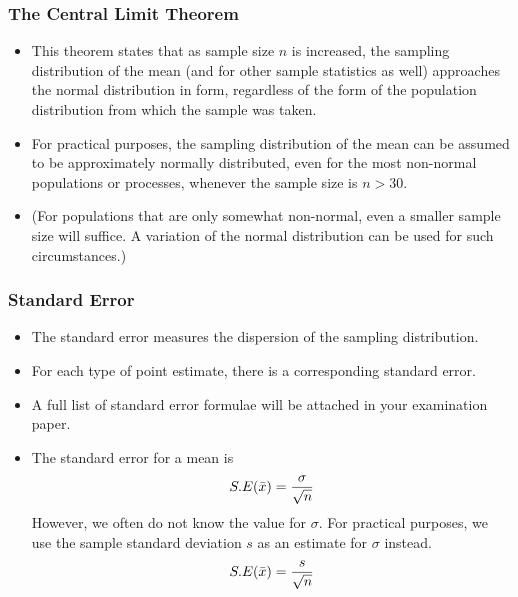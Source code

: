 

\begin{frame}
\frametitle{The Central Limit Theorem }
\begin{itemize}
\item This theorem states that as sample size $n$ is increased, the sampling distribution of the mean (and for other sample statistics as well) approaches the normal distribution in form, regardless of the form of the population distribution from
which the sample was taken.

\item For practical purposes, the sampling distribution of the mean can be assumed to be
approximately normally distributed, even for the most non-normal populations or processes, whenever the
sample size is $n > 30$.

\item (For populations that are only somewhat non-normal, even a smaller sample size will
suffice. A variation of the normal distribution can be used for such circumstances.)
\end{itemize}


\end{frame}










\begin{frame}
\frametitle{Standard Error}

\begin{itemize}
\item The standard error measures the dispersion of the sampling distribution.
\item For each type of point estimate, there is a corresponding standard error.
\item A full list of standard error formulae will be attached in your examination paper.
\item The standard error for a  mean is
\[ S.E( \bar{x} )  = {\sigma \over \sqrt{n}} \]
However, we often do not know the value for $\sigma$. For practical purposes, we use the sample standard deviation $s$ as an estimate for $\sigma$ instead.
\[ S.E( \bar{x} )  = {s \over \sqrt{n}} \]
\end{itemize}

\end{frame}


